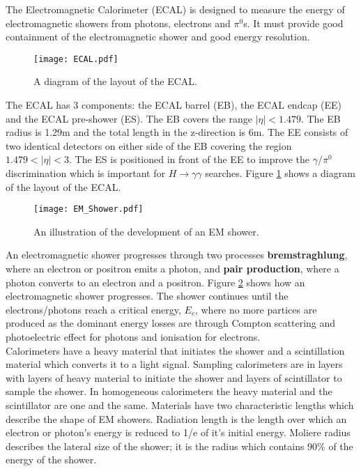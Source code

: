 The Electromagnetic Calorimeter (ECAL) is designed to measure the energy of
electromagnetic showers from photons, electrons and $\pi^{0}$s. It must provide
good containment of the electromagnetic shower and good energy resolution. \\

\begin{figure}
\begin{center}
\texttt{[image: ECAL.pdf]}
\end{center}
\caption{A diagram of the layout of the ECAL.}
\label{fig:ECAL}
\end{figure}

The ECAL has 3 components: the ECAL barrel (EB), the ECAL endcap (EE) and the
ECAL pre-shower (ES). The EB covers the range $|\eta| < 1.479$. The EB radius is
1.29m and the total length in the z-direction is 6m. The EE consists of two 
identical detectors on either side of the EB covering the region $1.479 < |\eta|
< 3$. The ES is positioned in front of the EE to improve the $\gamma$/$\pi^{0}$ 
discrimination which is important for $H\rightarrow\gamma\gamma$ searches. 
Figure \ref{fig:ECAL} shows a diagram of the layout of the ECAL. \\

\begin{figure}
\begin{center}
\texttt{[image: EM\_Shower.pdf]}
\end{center}
\caption{An illustration of the development of an EM shower.}
\label{fig:em_shower}
\end{figure}

An electromagnetic shower progresses through two processes {\bf bremstraghlung},
where an electron or positron emits a photon, and {\bf pair production}, where a
photon converts to an electron and a positron. Figure \ref{fig:em_shower} shows
how an electromagnetic shower progresses. The shower continues until the
electrons/photons reach a critical energy, $E_{c}$, where no more partices are 
produced as the dominant energy losses are through Compton scattering and
photoelectric effect for photons and ionisation for electrons. \\

Calorimeters have a heavy material that initiates the shower and a scintillation
material which converts it to a light signal. Sampling calorimeters are in
layers with layers of heavy material to initiate the shower and layers of
scintillator to sample the shower. In homogeneous calorimeters the heavy
material and the scintillator are one and the same. Materials have two
characteristic lengths which describe the shape of EM showers. Radiation length
is the length over which an electron or photon's energy is reduced to 1/e of
it's initial energy. Moliere radius describes the lateral size of the shower; it
is the radius which contains 90\% of the energy of the shower. \\  

